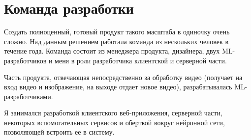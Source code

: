 \section{Команда разработки}

Создать полноценный, готовый продукт такого масштаба в одиночку очень сложно. Над данным решением работала команда из нескольких человек в течение года. Команда состоит из менеджера продукта, дизайнера, двух ML-разработчиков и меня в роли разработчика клиентской и серверной части.

Часть продукта, отвечающая непосредственно за обработку видео (получает на вход видео и изображение, на выходе отдает новое видео), разрабатывалась ML-разработчиками.

Я занимался разработкой клиентского веб-приложения, серверной части, некоторых вспомогательных сервисов и оберткой вокруг нейронной сети, позволяющей встроить ее в систему.